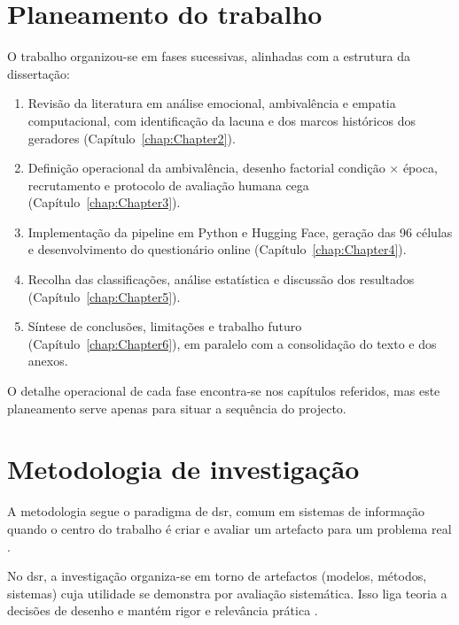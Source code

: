 
\section{Planeamento do trabalho}
\label{sec:planeamento}

O trabalho organizou-se em fases sucessivas, alinhadas com a estrutura da dissertação:

\begin{enumerate}
    \item Revisão da literatura em análise emocional, ambivalência e empatia computacional, com identificação da lacuna e dos marcos históricos dos geradores (Capítulo~\ref{chap:Chapter2}).
    \item Definição operacional da ambivalência, desenho factorial condição \(\times\) época, recrutamento e protocolo de avaliação humana cega (Capítulo~\ref{chap:Chapter3}).
    \item Implementação da pipeline em Python e Hugging Face, geração das 96 células e desenvolvimento do questionário online (Capítulo~\ref{chap:Chapter4}).
    \item Recolha das classificações, análise estatística e discussão dos resultados (Capítulo~\ref{chap:Chapter5}).
    \item Síntese de conclusões, limitações e trabalho futuro (Capítulo~\ref{chap:Chapter6}), em paralelo com a consolidação do texto e dos anexos.
\end{enumerate}

O detalhe operacional de cada fase encontra-se nos capítulos referidos, mas este planeamento serve apenas para situar a sequência do projecto.


\section{Metodologia de investigação}
\label{sec:metodologia}

A metodologia segue o paradigma de \gls{dsr}, comum em sistemas de informação quando o centro do trabalho é criar e avaliar um artefacto para um problema real \parencite{Hevner2004Design, Peffers2007Design}.

No \gls{dsr}, a investigação organiza-se em torno de artefactos (modelos, métodos, sistemas) cuja utilidade se demonstra por avaliação sistemática. Isso liga teoria a decisões de desenho e mantém rigor e relevância prática \parencite{Hevner2004Design}.

